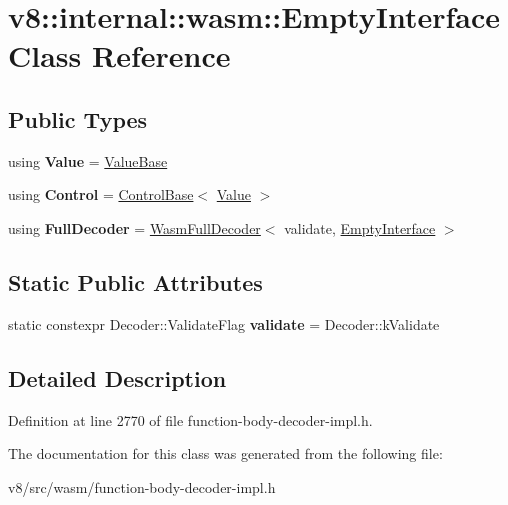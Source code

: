 \hypertarget{classv8_1_1internal_1_1wasm_1_1EmptyInterface}{}\section{v8\+:\+:internal\+:\+:wasm\+:\+:Empty\+Interface Class Reference}
\label{classv8_1_1internal_1_1wasm_1_1EmptyInterface}
\subsection*{Public Types}
\begin{DoxyCompactItemize}
\item 
\mbox{\label{classv8_1_1internal_1_1wasm_1_1EmptyInterface_a9afc5d9bd037a455f695ef6da5098819}} 
using {\bfseries Value} = \mbox{\hyperlink{structv8_1_1internal_1_1wasm_1_1ValueBase}{Value\+Base}}
\item 
\mbox{\label{classv8_1_1internal_1_1wasm_1_1EmptyInterface_a42ae5b19bbb656d313d8ee8336a4c05a}} 
using {\bfseries Control} = \mbox{\hyperlink{structv8_1_1internal_1_1wasm_1_1ControlBase}{Control\+Base}}$<$ \mbox{\hyperlink{structv8_1_1internal_1_1wasm_1_1ValueBase}{Value}} $>$
\item 
\mbox{\label{classv8_1_1internal_1_1wasm_1_1EmptyInterface_a11c614b3a15ad64c8325bc50b8642a93}} 
using {\bfseries Full\+Decoder} = \mbox{\hyperlink{classv8_1_1internal_1_1wasm_1_1WasmFullDecoder}{Wasm\+Full\+Decoder}}$<$ validate, \mbox{\hyperlink{classv8_1_1internal_1_1wasm_1_1EmptyInterface}{Empty\+Interface}} $>$
\end{DoxyCompactItemize}
\subsection*{Static Public Attributes}
\begin{DoxyCompactItemize}
\item 
\mbox{\label{classv8_1_1internal_1_1wasm_1_1EmptyInterface_ac82c0ba267ce12ab3cccb116c5bd4b35}} 
static constexpr Decoder\+::\+Validate\+Flag {\bfseries validate} = Decoder\+::k\+Validate
\end{DoxyCompactItemize}


\subsection{Detailed Description}


Definition at line 2770 of file function-\/body-\/decoder-\/impl.\+h.



The documentation for this class was generated from the following file\+:\begin{DoxyCompactItemize}
\item 
v8/src/wasm/function-\/body-\/decoder-\/impl.\+h\end{DoxyCompactItemize}
